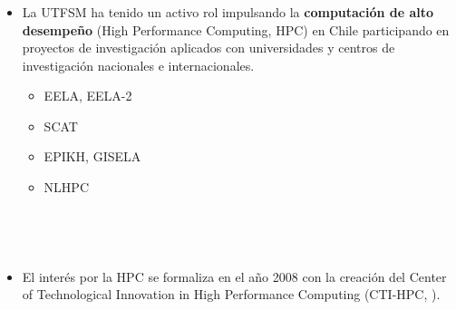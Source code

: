 
\frame
{
\frametitle{}
\begin{columns}
\begin{itemize}
\item La UTFSM ha tenido un activo rol impulsando la \textbf{computación de
alto desempeño} (High Performance Computing, HPC) en Chile participando en
proyectos
de investigación aplicados con universidades y centros de investigación
nacionales e internacionales. 
	\begin{itemize}
		\item EELA, EELA-2
		\item SCAT
		\item EPIKH, GISELA
		\item NLHPC
	\end{itemize}
\end{itemize}
\end{columns}
}


\frame
{
\frametitle{}
\begin{columns}
\begin{itemize}
\item El interés por la HPC se formaliza en el año 2008 con la creación del
Center of Technological Innovation in High Performance Computing (CTI-HPC,
).

\end{itemize}
\end{columns}
}





